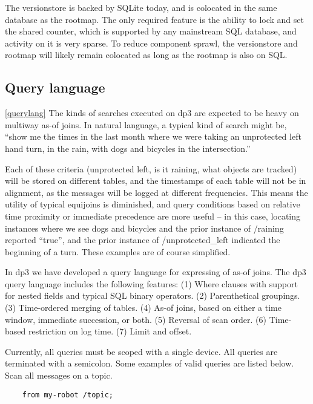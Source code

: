 \documentclass[9pt,twocolumn]{article}
\newcommand{\q}[1]{``#1''}
\begin{document}
    The versionstore is backed by SQLite today, and is colocated in the same
    database as the rootmap. The only required feature is the ability to lock and
    set the shared counter, which is supported by any mainstream SQL database,
    and activity on it is very sparse. To reduce component sprawl, the
    versionstore and rootmap will likely remain colocated as long as the rootmap
    is also on SQL.

    \subsection{Query language} \ref{querylang}
    The kinds of searches executed on dp3 are expected to be heavy on multiway
    as-of joins. In natural language, a typical kind of search might be, \q{show me
    the times in the last month where we were taking an unprotected left hand turn,
    in the rain, with dogs and bicycles in the intersection.}

    Each of these criteria (unprotected left, is it raining, what objects are
    tracked) will be stored on different tables, and the timestamps of each table
    will not be in alignment, as the messages will be logged at different
    frequencies. This means the utility of typical equijoins is diminished, and
    query conditions based on relative time proximity or immediate precedence are
    more useful – in this case, locating instances where we see dogs and bicycles
    and the prior instance of /raining reported \q{true}, and the prior instance of
    /unprotected\_left indicated the beginning of a turn. These examples are of
    course simplified.

    In dp3 we have developed a query language for expressing of as-of joins.
    The dp3 query language includes the following features: (1) Where clauses
    with support for nested fields and typical SQL binary operators. (2)
    Parenthetical groupings. (3) Time-ordered merging of tables. (4) As-of
    joins, based on either a time window, immediate succession, or both. (5)
    Reversal of scan order. (6) Time-based restriction on log time. (7) Limit
    and offset.

    Currently, all queries must be scoped with a single device. All queries are
    terminated with a semicolon. Some examples of valid queries are listed below. \\

    Scan all messages on a topic.
    \begin{lstlisting}
    from my-robot /topic;
    \end{lstlisting}
\end{document}
